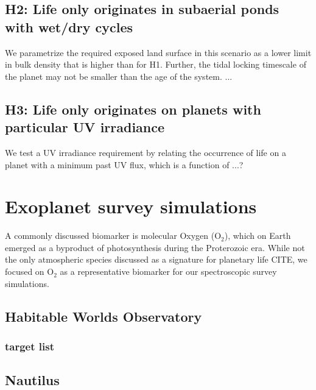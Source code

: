 \documentclass[modern,linenumbers]{aastex631}
\begin{document}
\subsection{H2: Life only originates in subaerial ponds with wet/dry cycles}
We parametrize the required exposed land surface in this scenario as a lower limit in bulk density that is higher than for H1.
Further, the tidal locking timescale of the planet may not be smaller than the age of the system.
...

\subsection{H3: Life only originates on planets with particular UV irradiance}
We test a UV irradiance requirement by relating the occurrence of life on a planet with a minimum past UV flux, which is a function of ...? 



\section{Exoplanet survey simulations}
A commonly discussed biomarker is molecular Oxygen (O$_2$), which on Earth emerged as a byproduct of photosynthesis during the Proterozoic era.
While not the only atmospheric species discussed as a signature for planetary life CITE, we focused on O$_2$ as a representative biomarker for our spectroscopic survey simulations.


\subsection{Habitable Worlds Observatory}
\subsubsection{target list}


\subsection{Nautilus}
\end{document}
